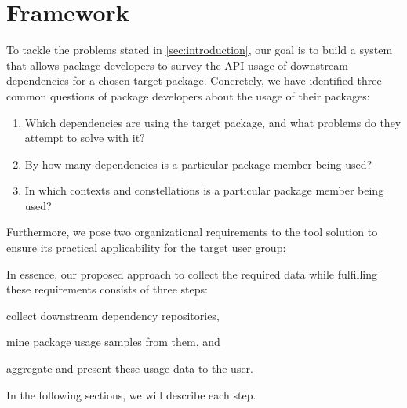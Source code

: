 \section{Framework}
\label{sec:framework}

To tackle the problems stated in \cref{sec:introduction}, our goal is to build a system that allows package developers to survey the API usage of downstream dependencies for a chosen target package.
Concretely, we have identified three common questions of package developers about the usage of their packages:

\begin{enumerate}[label=Q\arabic*]
	\item Which dependencies are using the target package, and what problems do they attempt to solve with it?
	\item By how many dependencies is a particular package member being used?
	\item In which contexts and constellations is a particular package member being used?
\end{enumerate}

Furthermore, we pose two organizational requirements to the tool solution to ensure its practical applicability for the target user group:


In essence, our proposed approach to collect the required data while fulfilling these requirements consists of three steps:
\begin{enumerate*}
	\item collect downstream dependency repositories,
	\item mine package usage samples from them,
	and \item aggregate and present these usage data to the user.
\end{enumerate*}
In the following sections, we will describe each step.
